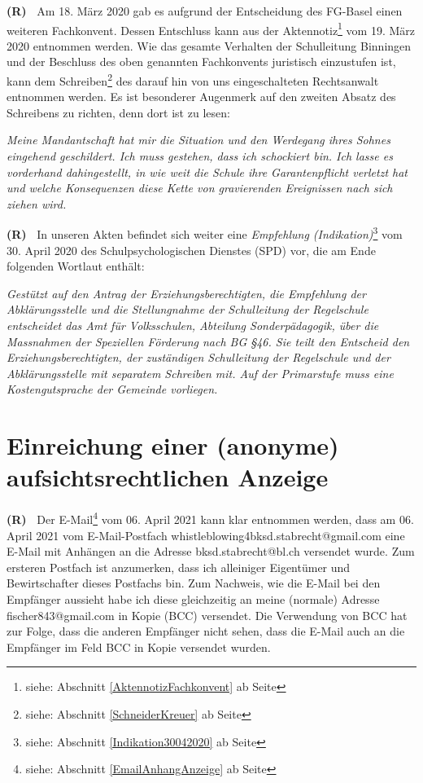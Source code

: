 \documentclass[paper=a4,fontsize=12pt, oneside, numbers=noenddot]{scrbook}
\newcounter{rz}
\newcommand{\Rz}{
	\addtocounter{rz}{1}\textbf{(R\arabic{rz})~}
}
\newcommand{\RzLabel}[1]{
	\refstepcounter{rz}\label{#1}\textbf{(R\arabic{rz})~}
}
\newcommand{\footnoteExt}[1]{\footnote{siehe: Abschnitt \ref{#1} ab Seite \pageref{#1}}}
\begin{document}
\Rz Am 18. März 2020 gab es aufgrund der Entscheidung des FG-Basel einen weiteren Fachkonvent. Dessen Entschluss kann aus der Aktennotiz\footnoteExt{AktennotizFachkonvent} vom 19. März 2020 entnommen werden. Wie das gesamte Verhalten der Schulleitung Binningen und der Beschluss des oben genannten Fachkonvents juristisch einzustufen ist, kann dem Schreiben\footnoteExt{SchneiderKreuer} des darauf hin von uns eingeschalteten Rechtsanwalt entnommen werden. Es ist besonderer Augenmerk auf den zweiten Absatz des Schreibens zu richten, denn dort ist zu lesen:
\begin{addmargin}[2.5em]{0em}\emph{Meine Mandantschaft hat mir die Situation und den Werdegang ihres Sohnes eingehend geschildert. Ich muss gestehen, dass ich schockiert bin. Ich lasse es vorderhand dahingestellt, in wie weit die Schule ihre Garantenpflicht verletzt hat und welche Konsequenzen diese Kette von gravierenden Ereignissen nach sich ziehen wird.}
\end{addmargin}

\RzLabel{TextIndikation} In unseren Akten befindet sich weiter eine \textit{Empfehlung (Indikation)}\footnoteExt{Indikation30042020} vom 30. April 2020 des Schulpsychologischen Dienstes (SPD) vor, die am Ende folgenden Wortlaut enthält:

\begin{addmargin}[2.5em]{0em}\emph{Gestützt auf den Antrag der Erziehungsberechtigten, die Empfehlung der Abklärungsstelle und die Stellungnahme der Schulleitung der Regelschule entscheidet das Amt für Volksschulen, Abteilung Sonderpädagogik, über die Massnahmen der Speziellen Förderung nach BG §46. Sie teilt den Entscheid den Erziehungsberechtigten, der zuständigen Schulleitung der Regelschule und der Abklärungsstelle mit separatem Schreiben mit. Auf der Primarstufe muss eine Kostengutsprache der Gemeinde vorliegen.}
\end{addmargin}



\section{Einreichung einer (anonyme) aufsichtsrechtlichen Anzeige}
\Rz Der E-Mail\footnoteExt{EmailAnhangAnzeige} vom 06. April 2021 kann klar entnommen werden, dass am 06. April 2021 vom E-Mail-Postfach whistleblowing4bksd.stabrecht@gmail.com eine E-Mail mit Anhängen an die Adresse bksd.stabrecht@bl.ch versendet wurde. Zum ersteren Postfach ist anzumerken, dass ich alleiniger Eigentümer und Bewirtschafter dieses Postfachs bin. Zum Nachweis, wie die E-Mail bei den Empfänger aussieht habe ich diese gleichzeitig an meine (normale) Adresse fischer843@gmail.com in Kopie (BCC) versendet. Die Verwendung von BCC hat zur Folge, dass die anderen Empfänger nicht sehen, dass die E-Mail auch an die Empfänger im Feld BCC in Kopie versendet wurden. 
\end{document}
